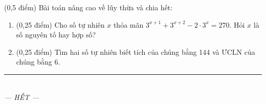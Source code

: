 \documentclass[12pt,a4paper]{article}
\begin{document}
\begin{ex} (0,5 điểm)
Bài toán nâng cao về lũy thừa và chia hết:
\begin{enumerate}[label=\textbf{\alph*)}, leftmargin=0.8cm, itemsep=2pt]
\item (0,25 điểm) Cho số tự nhiên $x$ thỏa mãn $3^{x+1} + 3^{x+2} - 2 \cdot 3^x = 270$. Hỏi $x$ là số nguyên tố hay hợp số?
\item (0,25 điểm) Tìm hai số tự nhiên biết tích của chúng bằng 144 và ƯCLN của chúng bằng 6.
\end{enumerate}
\end{ex}
\vspace{1.5mm}


\begin{center}
\rule{4cm}{0.4pt}\\
\textit{--- HẾT ---}
\end{center}
\end{document}
